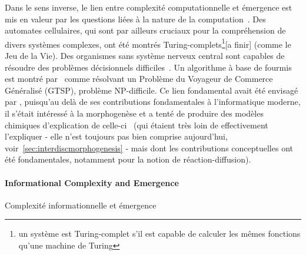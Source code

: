 Dans le sens inverse, le lien entre complexité computationnelle et émergence est mis en valeur par les questions liées à la nature de la computation~\cite{moore2011nature}. Des automates cellulaires, qui sont par ailleurs cruciaux pour la compréhension de divers systèmes complexes, ont été montrés Turing-complets\footnote{un système est Turing-complet s'il est capable de calculer les mêmes fonctions qu'une machine de Turing}[a finir] (comme le Jeu de la Vie). Des organismes sans système nerveux central sont capables de résoudre des problèmes décisionnels difficiles~\cite{reid2016decision}. Un algorithme à base de fourmis est montré par~\cite{Pintea2017} comme résolvant un Problème du Voyageur de Commerce Généralisé (GTSP), problème NP-difficile. Ce lien fondamental avait été envisagé par , puisqu'au delà de ses contributions fondamentales à l'informatique moderne, il s'était intéressé à la morphogenèse et a tenté de produire des modèles chimiques d'explication de celle-ci~\cite{turing1952chemical} (qui étaient très loin de effectivement l'expliquer - elle n'est toujours pas bien comprise aujourd'hui, voir~\ref{sec:interdiscmorphogenesis} - mais dont les contributions conceptuelles ont été fondamentales, notamment pour la notion de réaction-diffusion).





\paragraph{Informational Complexity and Emergence}{Complexité informationnelle et émergence}

